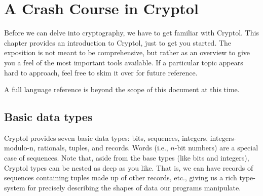 
\chapter{A Crash Course in Cryptol}
\label{cha:crash-course-cryptol}

Before we can delve into cryptography, we have to get familiar with
Cryptol.  This chapter provides an introduction to Cryptol, just to
get you started. The exposition is not meant to be comprehensive, but
rather as an overview to give you a feel of the most important tools
available.  If a particular topic appears hard to approach, feel free
to skim it over for future reference.

A full language reference is beyond the scope of this document at this
time.


\section{Basic data types}
\label{sec:basic-data-types}

Cryptol provides seven basic data types: bits, sequences, integers,
integers-modulo-n, rationals, tuples, and records.
Words (i.e., $n$-bit numbers) are a special case
of sequences. Note that, aside from the base types (like bits and integers),
Cryptol types can be nested as deep as you like. That is, we can have
records of sequences containing tuples made up of other records, etc.,
giving us a rich type-system for precisely describing the shapes of
data our programs manipulate.

